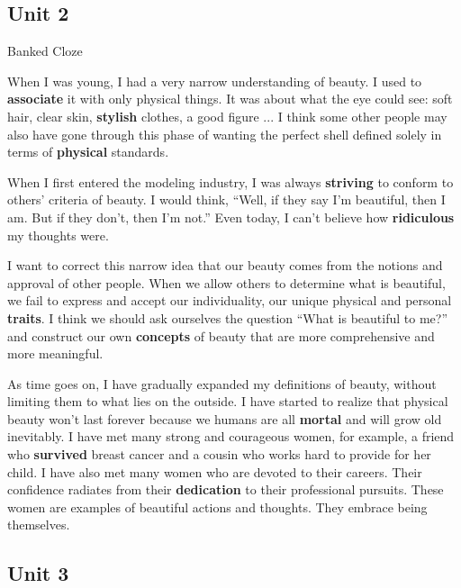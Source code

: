 \newpage

\subsection{Unit 2}

\begin{question}{Banked Cloze}

When I was young, I had a very narrow understanding of beauty. I used to \textbf{\color{red}associate} it with only physical things. It was about what the eye could see: soft hair, clear skin,  \textbf{\color{red}stylish} clothes, a good figure ... I think some other people may also have gone through this phase of wanting the perfect shell defined solely in terms of  \textbf{\color{red}physical} standards.

When I first entered the modeling industry, I was always  \textbf{\color{red}striving} to conform to others' criteria of beauty. I would think, ``Well, if they say I'm beautiful, then I am. But if they don't, then I'm not.'' Even today, I can't believe how  \textbf{\color{red}ridiculous} my thoughts were.

I want to correct this narrow idea that our beauty comes from the notions and approval of other people. When we allow others to determine what is beautiful, we fail to express and accept our individuality, our unique physical and personal \textbf{\color{red}traits}. I think we should ask ourselves the question ``What is beautiful to me?'' and construct our own \textbf{\color{red}concepts} of beauty that are more comprehensive and more meaningful.

As time goes on, I have gradually expanded my definitions of beauty, without limiting them to what lies on the outside. I have started to realize that physical beauty won't last forever because we humans are all  \textbf{\color{red}mortal} and will grow old inevitably. I have met many strong and courageous women, for example, a friend who \textbf{\color{red}survived} breast cancer and a cousin who works hard to provide for her child. I have also met many women who are devoted to their careers. Their confidence radiates from their \textbf{\color{red}dedication} to their professional pursuits. These women are examples of beautiful actions and thoughts. They embrace being themselves.

\end{question}

\newpage

\subsection{Unit 3}

